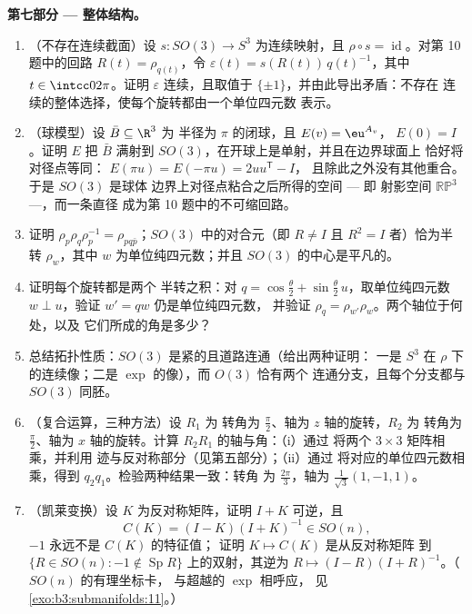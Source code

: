 \begin{problem}
\medskip
\noindent\textbf{第七部分 --- 整体结构。}
\begin{enumerate}[resume]
  \item （不存在连续截面）设 $s \colon SO(3) \to
        S^3$ 为连续映射，且 $\rho \circ s =
        \operatorname{id}$。对第 10 题中的回路 $R(t) =
        \rho_{q(t)}$，令 $\varepsilon(t) =
        s(R(t))\,q(t)^{-1}$，其中 $t \in \intcc0{2\pi}$。证明
        $\varepsilon$ 连续，且取值于
        $\{\pm1\}$，并由此导出矛盾：不存在
        连续的整体选择，使每个旋转都由一个单位四元数
        表示。
  \item （球模型）设 $\bar B \subseteq \R^3$ 为
        半径为 $\pi$ 的闭球，且 $E(v) = \eu^{A_v}$，
        $E(0) = I$。证明 $E$ 把 $\bar B$ 满射到
        $SO(3)$，在开球上是单射，并且在边界球面上
        恰好将对径点等同：
        $E(\pi u) = E(-\pi u) = 2uu^{\mathsf T} - I$，
        且除此之外没有其他重合。于是 $SO(3)$ 是球体
        边界上对径点粘合之后所得的空间 --- 即
        射影空间 $\mathbb{RP}^3$ ---，而一条直径
        成为第 10 题中的不可缩回路。
  \item 证明 $\rho_p\rho_q\rho_p^{-1} = \rho_{pq\bar
        p}$；$SO(3)$ 中的对合元（即 $R \neq
        I$ 且 $R^2 = I$ 者）恰为半转
        $\rho_w$，其中 $w$ 为单位纯四元数；并且
        $SO(3)$ 的中心是平凡的。
  \item 证明每个旋转都是两个
        半转之积：对 $q = \cos\frac\theta2 +
        \sin\frac\theta2\,u$，取单位纯四元数 $w \perp
        u$，验证 $w' = qw$ 仍是单位纯四元数，
        并验证 $\rho_q =
        \rho_{w'}\rho_w$。两个轴位于何处，以及
        它们所成的角是多少？
  \item 总结拓扑性质：$SO(3)$
        是紧的且道路连通（给出两种证明：
        一是 $S^3$ 在 $\rho$ 下的连续像；二是
        $\exp$ 的像），而 $O(3)$ 恰有两个
        连通分支，且每个分支都与 $SO(3)$ 同胚。

  \item （复合运算，三种方法）设 $R_1$ 为
        转角为 $\frac\pi2$、轴为 $z$ 轴的旋转，$R_2$ 为
        转角为 $\frac\pi2$、轴为 $x$ 轴的旋转。计算
        $R_2R_1$ 的轴与角：（i）通过
        将两个 $3\times3$ 矩阵相乘，并利用
        迹与反对称部分（见第五部分）；（ii）通过
        将对应的单位四元数相乘，得到
        $q_2q_1$。检验两种结果一致：转角
        为 $\frac{2\pi}3$，轴为 $\frac1{\sqrt3}(1, -1, 1)$。
  \item （凯莱变换）设 $K$ 为反对称矩阵，证明
        $I + K$ 可逆，且
        \[
        C(K) = (I - K)(I + K)^{-1} \in SO(n),
        \]
        $-1$ 永远不是 $C(K)$ 的特征值；
        证明 $K \mapsto C(K)$ 是从反对称矩阵
        到 $\{R \in SO(n) : -1 \notin
        \operatorname{Sp}R\}$ 上的双射，其逆为 $R \mapsto (I -
        R)(I + R)^{-1}$。（$SO(n)$ 的有理坐标卡，
        与超越的 $\exp$ 相呼应，
        见\cref{exo:b3:submanifolds:11}。）
\end{enumerate}
\end{problem}
